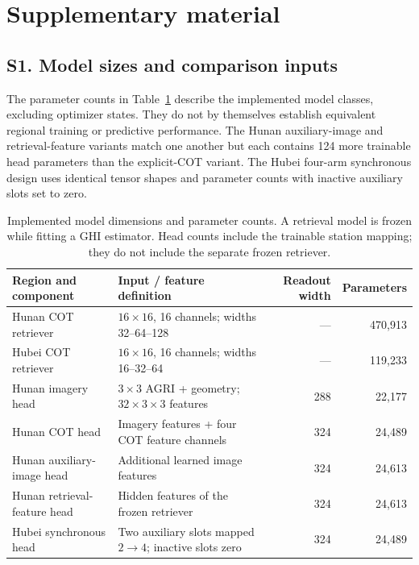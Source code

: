 \documentclass[11pt]{article}
\begin{document}
\clearpage
\section*{Supplementary material}
\setcounter{figure}{0}
\renewcommand{\thefigure}{S\arabic{figure}}
\setcounter{table}{0}
\renewcommand{\thetable}{S\arabic{table}}

\subsection*{S1. Model sizes and comparison inputs}
The parameter counts in Table~\ref{tab:model_sizes} describe the implemented model classes, excluding optimizer states. They do not by themselves establish equivalent regional training or predictive performance. The Hunan auxiliary-image and retrieval-feature variants match one another but each contains 124 more trainable head parameters than the explicit-COT variant. The Hubei four-arm synchronous design uses identical tensor shapes and parameter counts with inactive auxiliary slots set to zero.

\begin{table}[!htbp]\centering\small
\caption{Implemented model dimensions and parameter counts. A retrieval model is frozen while fitting a GHI estimator. Head counts include the trainable station mapping; they do not include the separate frozen retriever.}\label{tab:model_sizes}
\begin{tabularx}{\linewidth}{p{29mm}Xrr}\toprule
Region and component & Input / feature definition & Readout width & Parameters\\\midrule
Hunan COT retriever & $16\times16$, 16 channels; widths 32--64--128 & --- & 470,913\\
Hubei COT retriever & $16\times16$, 16 channels; widths 16--32--64 & --- & 119,233\\
Hunan imagery head & $3\times3$ AGRI + geometry; $32\times3\times3$ features & 288 & 22,177\\
Hunan COT head & Imagery features + four COT feature channels & 324 & 24,489\\
Hunan auxiliary-image head & Additional learned image features & 324 & 24,613\\
Hunan retrieval-feature head & Hidden features of the frozen retriever & 324 & 24,613\\
Hubei synchronous head & Two auxiliary slots mapped $2\to4$; inactive slots zero & 324 & 24,489\\\bottomrule
\end{tabularx}
\end{table}
\end{document}
